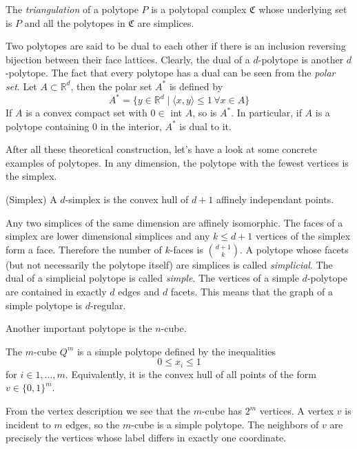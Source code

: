 The \textit{triangulation} of a polytope $P$ is a polytopal complex $\mathfrak{C}$ whose
underlying set is $P$ and all the polytopes in $\mathfrak{C}$ are simplices.


Two polytopes are said to be dual to each other if there is an inclusion 
reversing bijection between their face lattices. Clearly, the dual of a 
$d$-polytope is another $d$-polytope. The fact that every polytope has a dual 
can be seen from the \textit{polar set}. Let $A\subset \mathbb{R}^d$, then the 
polar set $A^*$ is defined by
\begin{equation}
 A^* = \{y \in \mathbb{R}^d \mid \langle x,y\rangle \leq 1 \, \forall  x  \in A 
\} 
\end{equation}
If $A$ is a convex compact set with $0 \in$ int $A$, so is $A^*$. In 
particular, if $A$ is a polytope containing $0$ in the interior, $A^*$ is dual 
to it. 

After all these theoretical construction, let's have a look at some concrete examples
of polytopes.
In any dimension, the polytope with the fewest vertices is the simplex. 
\begin{definition}
 (Simplex) A $d$-simplex is the convex hull of $d+1$ affinely independant 
points.
\end{definition}
Any two simplices of the same dimension are affinely isomorphic.
The faces of a simplex are lower dimensional simplices and any $k\le d+1$ vertices
of the simplex form a face. Therefore the number of $k$-faces is $\binom{d+1}{k}$.
 A polytope whose facets 
(but not necessarily the polytope itself) are simplices is called 
\textit{simplicial}. The dual of a simplicial polytope is called 
\textit{simple}. The vertices of a simple $d$-polytope are contained in exactly 
$d$ edges and $d$ facets. This means that the graph of a simple polytope is $d$-regular.

Another important polytope is the $n$-cube.

\begin{definition}
 The $m$-cube $Q^m$ is a simple polytope defined by the inequalities
\begin{equation}
 0 \leq x_i \leq 1 
\end{equation}
for $i \in 1,\dots, m$. Equivalently, it is the convex hull of all points of the form $v \in \{0,1\}^m$.
\end{definition}
From the vertex description we see that the $m$-cube has $2^m$ vertices. A vertex $v$
is incident to $m$ edges, so the $m$-cube is a simple polytope. The neighbors of $v$ are precisely
the vertices whose label differs in exactly one coordinate.

